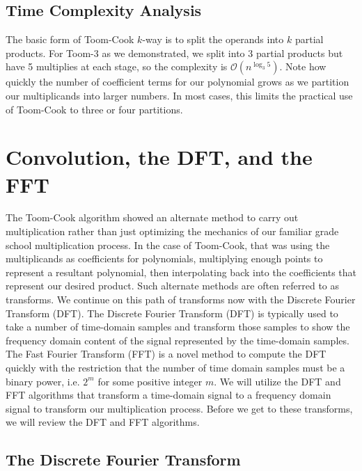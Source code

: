 \documentclass[psamsfonts,reqno]{amsart}
\theoremstyle{definition}
\theoremstyle{remark}
\numberwithin{equation}{section}
\begin{document}
\subsection{Time Complexity Analysis \nopunct}

The basic form of Toom-Cook $k$-way is to split the operands into $k$ partial products. For Toom-3 as we demonstrated, we split into 3 partial products but have 5 multiplies at each stage, so the complexity is $\mathcal{O}(n^{\log_3{5}})$. Note how quickly the number of coefficient terms for our polynomial grows as we partition our multiplicands into larger numbers. In most cases, this limits the practical use of Toom-Cook to three or four partitions. 

\section{Convolution, the DFT, and the FFT}

The Toom-Cook algorithm showed an alternate method to carry out multiplication rather than just optimizing the mechanics of our familiar grade school multiplication process. In the case of Toom-Cook, that was using the multiplicands as coefficients for polynomials, multiplying enough points to represent a resultant polynomial, then interpolating back into the coefficients that represent our desired product. Such alternate methods are often referred to as transforms. We continue on this path of transforms now with the Discrete Fourier Transform (DFT). The Discrete Fourier Transform (DFT) is typically used to take a number of time-domain samples and transform those samples to show the frequency domain content of the signal represented by the time-domain samples. The Fast Fourier Transform (FFT) is a novel method to compute the DFT quickly with the restriction that the number of time domain samples must be a binary power, i.e. $2^m$ for some positive integer $m$. We will utilize the DFT and FFT algorithms that transform a time-domain signal to a frequency domain signal to transform our multiplication process. Before we get to these transforms, we will review the DFT and FFT algorithms.

\subsection{The Discrete Fourier Transform}
\end{document}
